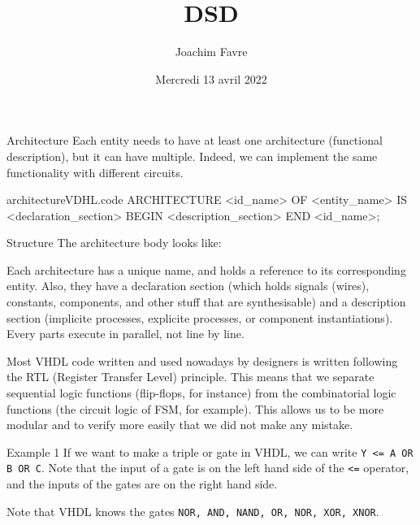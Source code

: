 \documentclass[a4paper]{article}
\title{DSD}
\author{Joachim Favre}
\date{Mercredi 13 avril 2022}
\begin{document}
\maketitle


\begin{parag}{Architecture}
    Each entity needs to have at least one architecture (functional description), but it can have multiple. Indeed, we can implement the same functionality with different circuits.
\end{parag}

\begin{filecontents*}[overwrite]{architectureVDHL.code}
ARCHITECTURE <id_name> OF <entity_name> IS
    <declaration_section>
BEGIN
    <description_section>
END <id_name>;
\end{filecontents*}


\begin{parag}{Structure}
    The architecture body looks like:

    Each architecture has a unique name, and holds a reference to its corresponding entity. Also, they have a declaration section (which holds signals (wires), constants, components, and other stuff that are synthesisable) and a description section (implicite processes, explicite processes, or component instantiations). Every parts execute in parallel, not line by line.

    Most VHDL code written and used nowadays by designers is written following the RTL (Register Transfer Level) principle. This means that we separate sequential logic functions (flip-flops, for instance) from the combinatorial logic functions (the circuit logic of FSM, for example). This allows us to be more modular and to verify more easily that we did not make any mistake.
\end{parag}


\begin{parag}{Example 1}
    If we want to make a triple or gate in VHDL, we can write \texttt{Y <= A OR B OR C}. Note that the input of a gate is on the left hand side of the \texttt{<=} operator, and the inputs of the gates are on the right hand side.

    Note that VHDL knows the gates \texttt{NOR, AND, NAND, OR, NOR, XOR, XNOR}.
\end{parag}
\end{document}
